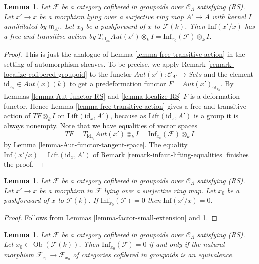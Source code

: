 \documentclass{stacks-project}
\theoremstyle{plain}
\newtheorem{lemma}[subsection]{Lemma}
\theoremstyle{definition}
\theoremstyle{remark}
\numberwithin{equation}{subsection}
\def\Ob{\mathop{\mathrm{Ob}}\nolimits}
\begin{document}
\begin{lemma}
\label{lemma-lifted-automorphisms-torsor}
Let $\mathcal{F}$ be a category cofibered in groupoids over
$\mathcal{C}_\Lambda$ satisfying (RS). Let $x' \to x$ be a
morphism lying over a surjective ring map $A' \to A$ with kernel $I$
annihilated by $\mathfrak m_{A'}$. Let $x_0$ be a pushforward of $x$ to
$\mathcal{F}(k)$. Then $\text{Inf}(x'/x)$ has a free and transitive action by
$T_{\text{id}_{x_0}} \mathit{Aut}(x') \otimes_k I
= \text{Inf}_{x_0}(\mathcal{F}) \otimes_k I$.
\end{lemma}

\begin{proof}
This is just the analogue of
Lemma \ref{lemma-free-transitive-action}
in the setting of automorphism sheaves.
To be precise, we apply
Remark \ref{remark-localize-cofibered-groupoid}
to the functor $\mathit{Aut}(x') : \mathcal{C}_{A'} \to \textit{Sets}$
and the element $\text{id}_{x_0} \in \mathit{Aut}(x)(k)$ to get
a predeformation functor $F = \mathit{Aut}(x')_{\text{id}_{x_0}}$. By
Lemmas \ref{lemma-Aut-functor-RS} and \ref{lemma-localize-RS}
$F$ is a deformation functor. Hence
Lemma \ref{lemma-free-transitive-action}
gives a free and transitive action
of $TF \otimes_k I$ on $\text{Lift}(\text{id}_x, A')$, because as
$\text{Lift}(\text{id}_x, A')$ is a group it is always nonempty.
Note that we have equalities of vector spaces
$$
TF = T_{\text{id}_{x_0}} \mathit{Aut}(x') \otimes_k I =
\text{Inf}_{x_0}(\mathcal{F}) \otimes_k I
$$
by
Lemma \ref{lemma-Aut-functor-tangent-space}.
The equality $\text{Inf}(x'/x) = \text{Lift}(\text{id}_x, A')$ of
Remark \ref{remark-infaut-lifting-equalities}
finishes the proof.
\end{proof}

\begin{lemma}
\label{lemma-infaut-trivial}
Let $\mathcal{F}$ be a category cofibered in groupoids over
$\mathcal{C}_\Lambda$ satisfying (RS). Let $x' \to x$ be a morphism
in $\mathcal{F}$ lying over a surjective ring map. Let $x_0$ be a pushforward
of $x$ to $\mathcal{F}(k)$. If $\text{Inf}_{x_0}(\mathcal{F}) = 0$ then
$\text{Inf}(x'/x) = 0$.
\end{lemma}

\begin{proof}
Follows from
Lemmas \ref{lemma-factor-small-extension} and
\ref{lemma-lifted-automorphisms-torsor}.
\end{proof}

\begin{lemma}
\label{lemma-infdef-trivial}
Let $\mathcal{F}$ be a category cofibered in groupoids over
$\mathcal{C}_\Lambda$ satisfying (RS). Let
$x_0 \in \Ob(\mathcal{F}(k))$. Then $\text{Inf}_{x_0}(\mathcal{F}) = 0$
if and only if the natural morphism
$\mathcal{F}_{x_0} \to \overline{\mathcal{F}_{x_0}}$ of
categories cofibered in groupoids is an equivalence.
\end{lemma}
\end{document}
